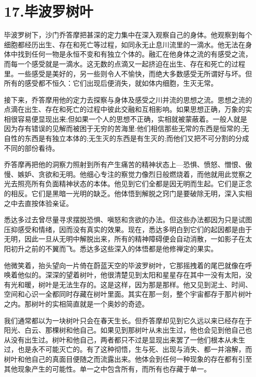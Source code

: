 \documentclass[12pt,twoside,openany]{book}
\begin{document}

\chapter{17.毕波罗树叶}\label{ch17}

毕波罗树下，沙门乔答摩把甚深的定力集中在深入观察自己的身体。他观察到每个细胞都经历出生、存在和死亡等过程，如同永无止息川流里的一滴水。他无法在身体中找到任何一物是永恒不变和有独立个体的。融汇在他身体之流的有感受之流，而每一个感受就是一滴水。这无数的点滴又一起挤迫在出生、存在和死亡的过程里。一些感受是美好的，另一些则令人不愉快，而绝大多数感受无所谓好与坏。但所有的感受都不恒久：它们出现后便消失，就如体内细胞，生灭无常。

接下来，乔答摩用他的定力去探察与身体及感受之川并流的思想之流。思想之流的点滴在出生、存在和死亡的过程中彼此交融和互相影响。如果思想正确，万象的实相很容易便显现出来;但如果一个人的思想不正确，实相就被蒙蔽着。一般人就是因为存有错误的见解而被困于无穷的苦海里:他们相信那些无常的东西是恒常的;无自性的东西是有独立本体的;无生灭的东西是有生灭的;而他们又把不可分割的分成不同的部份看待。

乔答摩再把他的洞察力照射到所有产生痛苦的精神状态上—恐惧、愤怒、憎恨、傲慢、嫉妒、贪欲和无明。他细心专注的察觉力像烈日般燃烧着，而他就用此觉察之光去照亮所有负面精神状态的本体。他见到它们全都是因无明而生起。它们是正念的相反。它们是黑暗一光明的缺乏。他体悟到解脱之窍门是要破除无明，深入实相之中去直按体验亲证。

悉达多过去曾尽量寻求摆脱恐惧、嗔怒和贪欲的办法。但这些办法都因为只是试图压抑感受和情绪，因而没有真实的效果。现在，悉达多明白到它们的起因都是由于无明，因此一旦从无明中解脱出来，所有的精神障碍便会自动消散，一如影子在太阳初升之前的不翼而飞。悉达多这些深入的体悟都是他修禅定的果实。

他微笑着，抬头望向一片倚在蔚蓝天空的毕波罗树叶，它那摇拽着的尾巴就像在呼唤着他似的。深深的望着树叶，他很清楚见到太阳和星星存在其中一没有太阳，没有光和暖，树叶是无法生存的。这是这样，因为那是那样。他又见到泥土、时间、空间和心识一全都同时存藏在树叶里面。其实在那一刻，整个宇宙都存于那片树叶之内。那树叶的实相简直就是一个奥妙的奇迹。

我们通常都以为一块树叶只会在春天生长。但乔答摩却见到它久远以来已经存在于阳光、白云、那棵树和他自己。如果见到那树叶从未出生过，他也会见到他自己也从没有出生过。树叶和他自己，两者都只不过是显现出来罢了一他们根本从未生过，也是永不可能灭亡的。有了这种彻悟，生与死、出现与消失、都一并溶解，而树叶和他自己的真面目便随之而流露出来。他体会到任何一种现象的存在都有引至其他现象产生的可能性。单一之中包含所有，而所有也存藏于单一。
\end{document}
